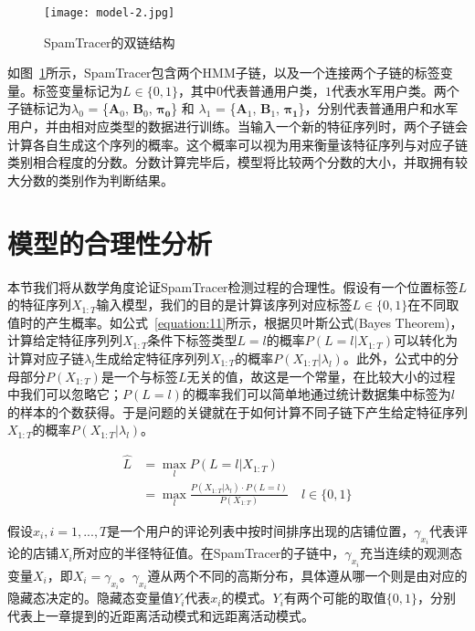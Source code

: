 \begin{figure}[htbp]
	\centering
	\begin{minipage}[htbp]{0.6\textwidth}
		\centering
		\texttt{[image: model-2.jpg]}
		\caption[SpamTracer的双链结构]
		{SpamTracer的双链结构\label{fig:lhmm}}		
	\end{minipage}     
\end{figure}


如图~\ref{fig:lhmm}所示，SpamTracer包含两个HMM子链，以及一个连接两个子链的标签变量。标签变量标记为$L\in\{0,1\}$，其中$0$代表普通用户类，$1$代表水军用户类。两个子链标记为$\lambda_{0}$ = \{$\mathbf{A}_0$, $\mathbf{B}_0$, $\mathbf{\pi_0}$\} 和 $\lambda_{1}$ = \{$\mathbf{A}_1$, $\mathbf{B}_1$, $\mathbf{\pi_1}$\}，分别代表普通用户和水军用户，并由相对应类型的数据进行训练。当输入一个新的特征序列时，两个子链会计算各自生成这个序列的概率。这个概率可以视为用来衡量该特征序列与对应子链类别相合程度的分数。分数计算完毕后，模型将比较两个分数的大小，并取拥有较大分数的类别作为判断结果。


\section{模型的合理性分析}


本节我们将从数学角度论证SpamTracer检测过程的合理性。假设有一个位置标签$L$的特征序列$X_{1:T}$输入模型，我们的目的是计算该序列对应标签$L\in\{0,1\}$在不同取值时的产生概率。如公式~\eqref{equation:11}所示，根据贝叶斯公式(Bayes Theorem)，计算给定特征序列列$X_{1:T}$条件下标签类型$L = l$的概率$P(L=l|X_{1:T})$可以转化为计算对应子链$\lambda_l$生成给定特征序列列$X_{1:T}$的概率$P(X_{1:T} | \lambda_l)$。此外，公式中的分母部分$P(X_{1:T})$是一个与标签$L$无关的值，故这是一个常量，在比较大小的过程中我们可以忽略它；$P(L = l)$的概率我们可以简单地通过统计数据集中标签为$l$的样本的个数获得。于是问题的关键就在于如何计算不同子链下产生给定特征序列$X_{1:T}$的概率$P(X_{1:T} | \lambda_l)$。

\begin{equation}
\label{equation:11}
\begin{aligned}
\widehat{L} & = \max_{l}{P(L = l| X_{1:T})} \\
& = \max_{l}{\frac{P(X_{1:T} | \lambda_l) \cdot P(L = l)}{P(X_{1:T})}} \quad l\in \{0,1\}
\end{aligned}
\end{equation}

假设$x_i, i = 1,...,T$是一个用户的评论列表中按时间排序出现的店铺位置，$\gamma_{x_i}$代表评论的店铺$X_i$所对应的半径特征值。在SpamTracer的子链中，$\gamma_{x_i}$充当连续的观测态变量$X_i$，即$X_i = \gamma_{x_i}$。$\gamma_{x_i}$遵从两个不同的高斯分布，具体遵从哪一个则是由对应的隐藏态决定的。隐藏态变量值$Y_i$代表$x_i$的模式。$Y_i$有两个可能的取值$\{0,1\}$，分别代表上一章提到的近距离活动模式和远距离活动模式。

